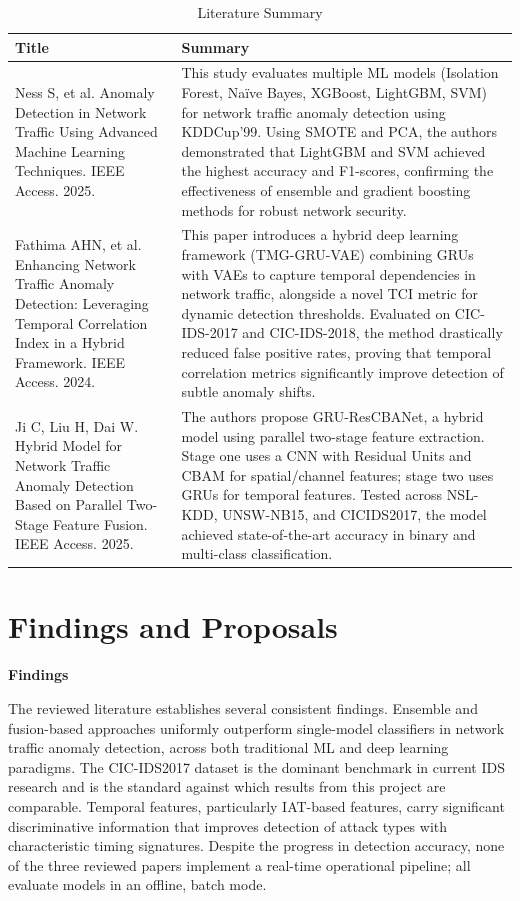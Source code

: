 \documentclass[12pt,a4paper]{report}
\begin{document}
\begin{table}[H]
\centering
\renewcommand{\arraystretch}{1.4}
\begin{tabularx}{\textwidth}{|X|X|}
\hline
\textbf{Title} & \textbf{Summary} \\
\hline
Ness S, et al. Anomaly Detection in Network Traffic Using Advanced Machine Learning Techniques. IEEE Access. 2025. &
This study evaluates multiple ML models (Isolation Forest, Na\"{i}ve Bayes, XGBoost, LightGBM, SVM) for network traffic anomaly detection using KDDCup'99. Using SMOTE and PCA, the authors demonstrated that LightGBM and SVM achieved the highest accuracy and F1-scores, confirming the effectiveness of ensemble and gradient boosting methods for robust network security. \\
\hline
Fathima AHN, et al. Enhancing Network Traffic Anomaly Detection: Leveraging Temporal Correlation Index in a Hybrid Framework. IEEE Access. 2024. &
This paper introduces a hybrid deep learning framework (TMG-GRU-VAE) combining GRUs with VAEs to capture temporal dependencies in network traffic, alongside a novel TCI metric for dynamic detection thresholds. Evaluated on CIC-IDS-2017 and CIC-IDS-2018, the method drastically reduced false positive rates, proving that temporal correlation metrics significantly improve detection of subtle anomaly shifts. \\
\hline
Ji C, Liu H, Dai W. Hybrid Model for Network Traffic Anomaly Detection Based on Parallel Two-Stage Feature Fusion. IEEE Access. 2025. &
The authors propose GRU-ResCBANet, a hybrid model using parallel two-stage feature extraction. Stage one uses a CNN with Residual Units and CBAM for spatial/channel features; stage two uses GRUs for temporal features. Tested across NSL-KDD, UNSW-NB15, and CICIDS2017, the model achieved state-of-the-art accuracy in binary and multi-class classification. \\
\hline
\end{tabularx}
\caption{Literature Summary}
\label{tab:lit_summary}
\end{table}

\clearpage
\section{Findings and Proposals}

\textbf{Findings}

The reviewed literature establishes several consistent findings. Ensemble and fusion-based approaches uniformly outperform single-model classifiers in network traffic anomaly detection, across both traditional ML and deep learning paradigms. The CIC-IDS2017 dataset is the dominant benchmark in current IDS research and is the standard against which results from this project are comparable. Temporal features, particularly IAT-based features, carry significant discriminative information that improves detection of attack types with characteristic timing signatures. Despite the progress in detection accuracy, none of the three reviewed papers implement a real-time operational pipeline; all evaluate models in an offline, batch mode.
\end{document}
